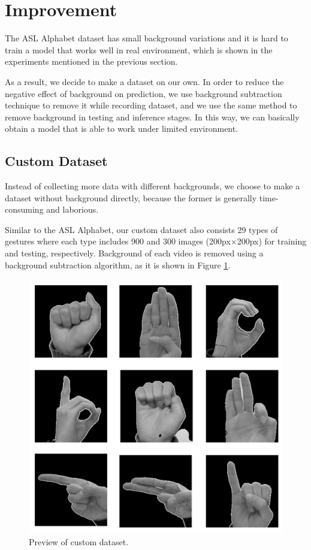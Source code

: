 \documentclass[10pt,twocolumn,letterpaper]{article}
\begin{document}
\section{Improvement}

The ASL Alphabet dataset has small background variations and it is hard to train a model that works well in real environment, which is shown in the experiments mentioned in the previous section.

As a result, we decide to make a dataset on our own. In order to reduce the negative effect of background on prediction, we use background subtraction technique to remove it while recording dataset, and we use the same method to remove background in testing and inference stages. In this way, we can basically obtain a model that is able to work under limited environment.

\subsection{Custom Dataset}

Instead of collecting more data with different backgrounds, we choose to make a dataset without background directly, because the former is generally time-consuming and laborious.

Similar to the ASL Alphabet, our custom dataset also consists 29 types of gestures where each type includes 900 and 300 images (200px$\times$200px) for training and testing, respectively. Background of each video is removed using a background subtraction algorithm, as it is shown in Figure \ref{fig:dataset}.

\begin{figure}[h]
\begin{center}
\includegraphics[width=0.8\linewidth]{imgs/dataset.png}
\end{center}
   \caption{Preview of custom dataset.}
\label{fig:dataset}
\end{figure}
\end{document}
